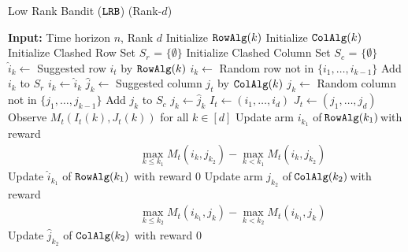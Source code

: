 \begin{algorithm}[!ht]
  \caption{Low Rank Bandit (${\tt LRB}$) (Rank-$d$)}
  \label{alg:LRB1}
  \begin{algorithmic}[1]
    \State \textbf{Input:} Time horizon $n$, Rank $d$
      \State Initialize ${\tt RowAlg} (k)$
      \State Initialize ${\tt ColAlg} (k)$
    \EndFor
    \State Initialize Clashed Row Set $S_r$ = $\{\emptyset\}$
    \State Initialize Clashed Column Set $S_c$ = $\{\emptyset\}$
        \State $\hat{i}_k \gets$ Suggested row $i_t$ by ${\tt RowAlg}(k)$
          \State $i_k \gets$ Random row not in $\{i_1, \dots, i_{k - 1}\}$
          \State Add $i_k$ to $S_r$
        \Else
          \State $i_k \gets \hat{i}_k$
        \EndIf
        \EndFor
        \State $\hat{j}_k \gets$ Suggested column $j_t$ by ${\tt ColAlg}(k)$
          \State $j_k \gets$ Random column not in $\{j_1, \dots, j_{k - 1}\}$
          \State Add $j_k$ to $S_c$
        \Else
          \State $j_k \gets \hat{j}_k$
        \EndIf
      \EndFor
      \State $I_t \gets (i_1, \dots, i_d)$
      \State $J_t \gets (j_1, \dots, j_d)$
      \State Observe $M_t(I_t(k), J_t(k))$ for all $k \in [d]$
        \State Update arm $\! i_{k_1}\!$ of $\!{\tt RowAlg}(k_1)\!$ with reward
       \begin{align*}
    &\qquad \qquad \max_{k \leq k_1} M_t(i_k, j_{k_2}) - \max_{k < k_1} M_t(i_k, j_{k_2})
        \end{align*}
        \Else
          \State Update $\hat{i}_{k_1}$ of ${\tt RowAlg}(k_1)$ with reward $0$
        \EndIf
    		\State Update arm $\!j_{k_2}\!$ of $\!{\tt ColAlg}(k_2)\!$ with reward 
         \begin{align*}
         &\qquad \qquad \max_{k \leq k_2} M_t(i_{k_1}, j_k)  - \max_{k < k_2} M_t(i_{k_1}, j_k)
        \end{align*}
        \Else
          \State Update $\hat{j}_{k_2}$ of ${\tt ColAlg}(k_2)$ with reward $0$
        \EndIf
      \EndFor
      \EndFor
     \EndFor
  \end{algorithmic}
\end{algorithm}
